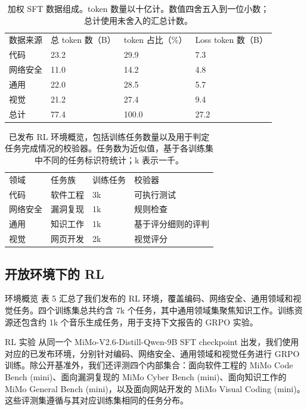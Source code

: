\documentclass[
  10
]{article}
\begin{document}
{\footnotesize
\begin{longtable}[]{@{}|l|l|l|l|@{}}
\caption{加权 SFT 数据组成。token 数量以十亿计。数值四舍五入到一位小数；总计使用未舍入的汇总计数。}\label{tab:4}\\
\toprule\noalign{}
\endfirsthead
\multicolumn{4}{r}{（续表）}\\
\toprule\noalign{}
\endhead
\bottomrule\noalign{}
\endlastfoot
\hline
数据来源 & 总 token 数（B） & token 占比（\%） & Loss token 数（B） \\
\hline
代码 & 23.2 & 29.9 & 7.3 \\
\hline
网络安全 & 11.0 & 14.2 & 4.8 \\
\hline
通用 & 22.0 & 28.5 & 5.7 \\
\hline
视觉 & 21.2 & 27.4 & 9.4 \\
\hline
总计 & 77.4 & 100.0 & 27.2 \\
\hline
\end{longtable}
}



{\footnotesize
\begin{longtable}[]{@{}|l|l|l|l|@{}}
\caption{已发布 RL 环境概览，包括训练任务数量以及用于判定任务完成情况的校验器。任务数为近似值，基于各训练集中不同的任务标识符统计；k 表示一千。}\label{tab:5}\\
\toprule\noalign{}
\endfirsthead
\multicolumn{4}{r}{（续表）}\\
\toprule\noalign{}
\endhead
\bottomrule\noalign{}
\endlastfoot
\hline
领域 & 任务族 & 训练任务 & 校验器 \\
\hline
代码 & 软件工程 & 3k & 可执行测试 \\
\hline
网络安全 & 漏洞复现 & 1k & 规则检查 \\
\hline
通用 & 知识工作 & 1k & 基于评分细则的评判 \\
\hline
视觉 & 网页开发 & 2k & 视觉评分 \\
\hline
\end{longtable}
}

\subsection{开放环境下的 RL}\label{rl-with-open-environments}

环境概览 表 5 汇总了我们发布的 RL 环境，覆盖编码、网络安全、通用领域和视觉任务。四个训练集总共约含 7k 个任务，其中通用领域集聚焦知识工作。训练资源还包含约 1k 个音乐生成任务，用于支持下文报告的 GRPO 实验。

RL 实验 从同一个 MiMo-V2.6-Distill-Qwen-9B SFT checkpoint 出发，我们使用对应的已发布环境，分别针对编码、网络安全、通用领域和视觉任务进行 GRPO 训练。除公开基准外，我们还评测四个内部集合：面向软件工程的 MiMo Code Bench (mini)、面向漏洞复现的 MiMo Cyber Bench (mini)、面向知识工作的 MiMo General Bench (mini)，以及面向网站开发的 MiMo Visual Coding (mini)。这些评测集遵循与其对应训练集相同的任务分布。
\end{document}
